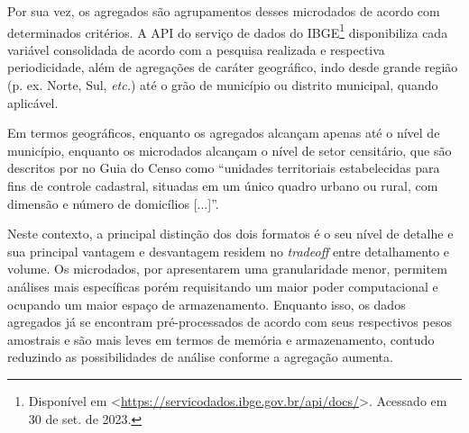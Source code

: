     Por sua vez, os agregados são agrupamentos desses microdados de acordo com determinados critérios. A API do serviço de dados do IBGE\footnote{Disponível em <\url{https://servicodados.ibge.gov.br/api/docs/}>. Acessado em 30 de set. de 2023.} disponibiliza cada variável consolidada de acordo com a pesquisa realizada e respectiva periodicidade, além de agregações de caráter geográfico, indo desde grande região (p. ex. Norte, Sul, \textit{etc.}) até o grão de município ou distrito municipal, quando aplicável.

    Em termos geográficos, enquanto os agregados alcançam apenas até o nível de município, enquanto os microdados alcançam o nível de setor censitário, que são descritos por \textcite{Guia-Censo-2010} no Guia do Censo como ``unidades territoriais estabelecidas para fins de controle cadastral, situadas em um único quadro urbano ou rural, com dimensão e número de domicílios [...]''.

    Neste contexto, a principal distinção dos dois formatos é o seu nível de detalhe e sua principal vantagem e desvantagem residem no \textit{tradeoff} entre detalhamento e volume. Os microdados, por apresentarem uma granularidade menor, permitem análises mais específicas porém requisitando um maior poder computacional e ocupando um maior espaço de armazenamento. Enquanto isso, os dados agregados já se encontram pré-processados de acordo com seus respectivos pesos amostrais e são mais leves em termos de memória e armazenamento, contudo reduzindo as possibilidades de análise conforme a agregação aumenta.

    
    
